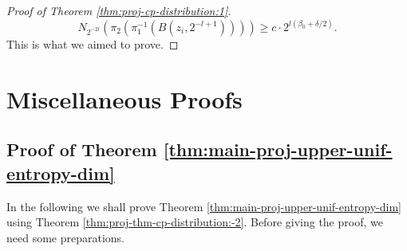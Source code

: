 \documentclass[a4paper,11pt]{amsart}
\theoremstyle{definition}
\numberwithin{equation}{section}
\DeclareMathOperator{\dist}{{\rm dist}}
\begin{document}
\begin{proof}[Proof of Theorem \ref{thm:proj-cp-distribution:1}]
\begin{equation*}\label{eq:thm-proj-cp-distribution-1:20}
N_{2^{-2l}}\left( \pi_2\left( \pi_1^{-1}(B(z_i,2^{-l+1})) \right) \right) \ge c\cdot 2^{l(\beta_0+\delta/2)}.
\end{equation*}
This is what we aimed to prove.

\end{proof}



\section{Miscellaneous Proofs}\label{section:remainning proofs}

\subsection{Proof of Theorem  \ref{thm:main-proj-upper-unif-entropy-dim}}

In the following we shall prove Theorem  \ref{thm:main-proj-upper-unif-entropy-dim} using Theorem   \ref{thm:proj-thm-cp-distribution:-2}.   Before giving the proof, we need some preparations.  
\end{document}
